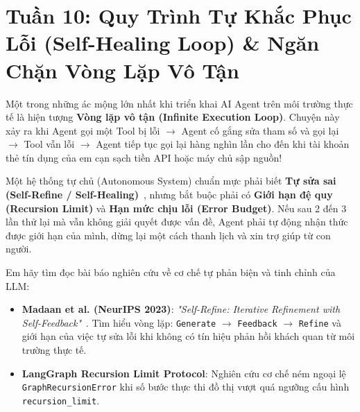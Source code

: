﻿\section{Tuần 10: Quy Trình Tự Khắc Phục Lỗi (Self-Healing Loop) \& Ngăn Chặn Vòng Lặp Vô Tận}
\label{sec:tuan_10}

\begin{advisorbox}
Một trong những ác mộng lớn nhất khi triển khai AI Agent trên môi trường thực tế là hiện tượng \textbf{Vòng lặp vô tận (Infinite Execution Loop)}. Chuyện này xảy ra khi Agent gọi một Tool bị lỗi $\rightarrow$ Agent cố gắng sửa tham số và gọi lại $\rightarrow$ Tool vẫn lỗi $\rightarrow$ Agent tiếp tục gọi lại hàng nghìn lần cho đến khi tài khoản thẻ tín dụng của em cạn sạch tiền API hoặc máy chủ sập nguồn!

Một hệ thống tự chủ (Autonomous System) chuẩn mực phải biết \textbf{Tự sửa sai (Self-Refine / Self-Healing)}~\cite{madaan2023selfrefine}, nhưng bắt buộc phải có \textbf{Giới hạn đệ quy (Recursion Limit)} và \textbf{Hạn mức chịu lỗi (Error Budget)}. Nếu sau 2 đến 3 lần thử lại mà vẫn không giải quyết được vấn đề, Agent phải tự động nhận thức được giới hạn của mình, dừng lại một cách thanh lịch và xin trợ giúp từ con người.
\end{advisorbox}

\begin{literaturebox}
Em hãy tìm đọc bài báo nghiên cứu về cơ chế tự phản biện và tinh chỉnh của LLM:
\begin{itemize}[leftmargin=1.5em]
    \item \textbf{Madaan et al. (NeurIPS 2023)}: \textit{"Self-Refine: Iterative Refinement with Self-Feedback"}~\cite{madaan2023selfrefine}. Tìm hiểu vòng lặp: \texttt{Generate} $\rightarrow$ \texttt{Feedback} $\rightarrow$ \texttt{Refine} và giới hạn của việc tự sửa lỗi khi không có tín hiệu phản hồi khách quan từ môi trường thực tế.
    \item \textbf{LangGraph Recursion Limit Protocol}: Nghiên cứu cơ chế ném ngoại lệ \texttt{GraphRecursionError} khi số bước thực thi đồ thị vượt quá ngưỡng cấu hình \texttt{recursion\_limit}.
\end{itemize}
\end{literaturebox}

